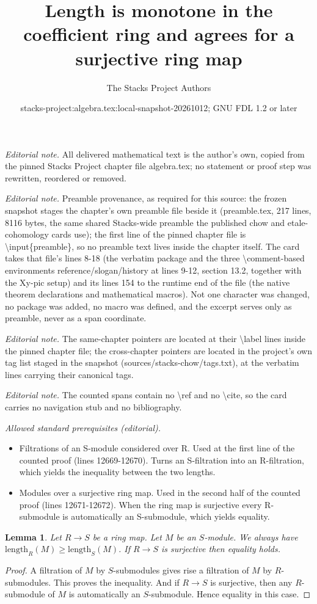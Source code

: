\documentclass[10pt,a4paper]{amsart}
\title{Length is monotone in the coefficient ring and agrees for a surjective ring map}
\author{The Stacks Project Authors}
\date{stacks-project:algebra.tex:local-snapshot-20261012; GNU FDL 1.2 or later}
\theoremstyle{plain}
\newtheorem{lemma}[subsection]{Lemma}
\theoremstyle{definition}
\theoremstyle{remark}
\numberwithin{equation}{subsection}
\begin{document}
\maketitle
\noindent\textit{Editorial note.} All delivered mathematical text is the author's own, copied from the pinned Stacks Project chapter file algebra.tex; no statement or proof step was rewritten, reordered or removed.\par\medskip
\noindent\textit{Editorial note.} Preamble provenance, as required for this source: the frozen snapshot stages the chapter's own preamble file beside it (preamble.tex, 217 lines, 8116 bytes, the same shared Stacks-wide preamble the published chow and etale-cohomology cards use); the first line of the pinned chapter file is \textbackslash{}input\{preamble\}, so no preamble text lives inside the chapter itself. The card takes that file's lines 8-18 (the verbatim package and the three \textbackslash{}comment-based environments reference/slogan/history at lines 9-12, section 13.2, together with the Xy-pic setup) and its lines 154 to the runtime end of the file (the native theorem declarations and mathematical macros). Not one character was changed, no package was added, no macro was defined, and the excerpt serves only as preamble, never as a span coordinate.\par\medskip
\noindent\textit{Editorial note.} The same-chapter pointers are located at their \textbackslash{}label lines inside the pinned chapter file; the cross-chapter pointers are located in the project's own tag list staged in the snapshot (sources/stacks-chow/tags.txt), at the verbatim lines carrying their canonical tags.\par\medskip
\noindent\textit{Editorial note.} The counted spans contain no \textbackslash{}ref and no \textbackslash{}cite, so the card carries no navigation stub and no bibliography.\par\medskip
\noindent\textit{Allowed standard prerequisites (editorial).}\begin{itemize}
\item Filtrations of an S-module considered over R. Used at the first line of the counted proof (lines 12669-12670). Turns an S-filtration into an R-filtration, which yields the inequality between the two lengths.
\item Modules over a surjective ring map. Used in the second half of the counted proof (lines 12671-12672). When the ring map is surjective every R-submodule is automatically an S-submodule, which yields equality.
\end{itemize}\medskip
\begin{lemma}
\label{lemma-length-independent}
Let $R \to S$ be a ring map. Let $M$ be an $S$-module.
We always have $\text{length}_R(M) \geq \text{length}_S(M)$.
If $R \to S$ is surjective then equality holds.
\end{lemma}

\begin{proof}
A filtration of $M$ by $S$-submodules gives rise a filtration
of $M$ by $R$-submodules. This proves the inequality.
And if $R \to S$ is surjective, then any $R$-submodule
of $M$ is automatically an $S$-submodule. Hence equality
in this case.
\end{proof}
\end{document}

